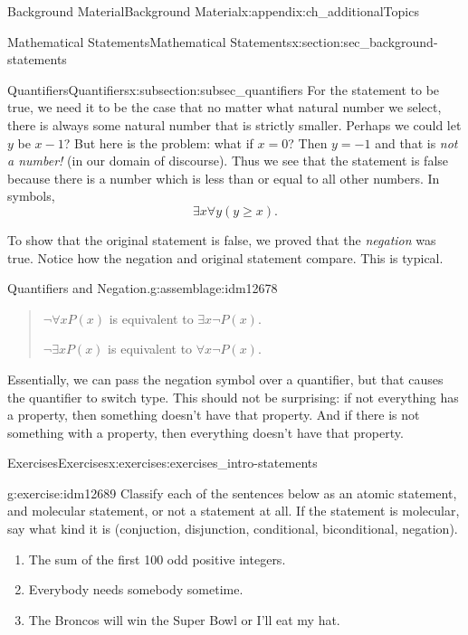 \documentclass[oneside,10pt,]{book}
\numberwithin{equation}{chapter}
\begin{document}
\begin{appendixptx}{Background Material}{}{Background Material}{}{}{x:appendix:ch_additionalTopics}
\begin{sectionptx}{Mathematical Statements}{}{Mathematical Statements}{}{}{x:section:sec_background-statements}
\begin{subsectionptx}{Quantifiers}{}{Quantifiers}{}{}{x:subsection:subsec_quantifiers}
For the statement to be true, we need it to be the case that no matter what natural number we select, there is always some natural number that is strictly smaller. Perhaps we could let \(y\) be \(x-1\)? But here is the problem: what if \(x = 0\)? Then \(y = -1\) and that is \emph{not a number!} (in our domain of discourse). Thus we see that the statement is false because there is a number which is less than or equal to all other numbers. In symbols,%
\begin{equation*}
\exists x \forall y (y \ge x).
\end{equation*}
%
\par
To show that the original statement is false, we proved that the \emph{negation} was true. Notice how the negation and original statement compare. This is typical.%
\begin{assemblage}{Quantifiers and Negation.}{g:assemblage:idm12678}%
\begin{quote}%
\(\neg \forall x P(x)\) is equivalent to \(\exists x \neg P(x)\).%
\par
\(\neg \exists x P(x)\) is equivalent to \(\forall x \neg P(x)\).%
\end{quote}
\end{assemblage}
Essentially, we can pass the negation symbol over a quantifier, but that causes the quantifier to switch type. This should not be surprising: if not everything has a property, then something doesn't have that property. And if there is not something with a property, then everything doesn't have that property.%
\end{subsectionptx}
%
%
\typeout{************************************************}
\typeout{************************************************}
%
\begin{exercises-subsection}{Exercises}{}{Exercises}{}{}{x:exercises:exercises_intro-statements}
\begin{divisionexercise}{1}{}{}{g:exercise:idm12689}%
Classify each of the sentences below as an atomic statement, and molecular statement, or not a statement at all.  If the statement is molecular, say what kind it is (conjuction, disjunction, conditional, biconditional, negation).%
\begin{enumerate}[label=(\alph*)]
\item{}The sum of the first 100 odd positive integers.%
\item{}Everybody needs somebody sometime.%
\item{}The Broncos will win the Super Bowl or I'll eat my hat.%

\end{enumerate}
\end{divisionexercise}
\end{exercises-subsection}
\end{sectionptx}
\end{appendixptx}
\end{document}
